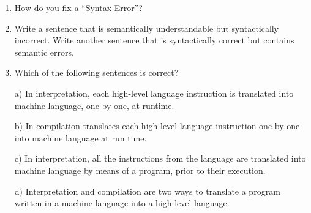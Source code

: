 \begin{enumerate}
(1) Central processing unit, 

(2) Main Memory,

(3) Secondary Memory,

(4) Input Device, and

(5) Output Device.

For example, ``What is the human equivalent to a Central Processing Unit''?

\item How do you fix a ``Syntax Error''?

\item  Write a sentence that is semantically understandable but syntactically incorrect. Write another sentence that is syntactically correct but contains semantic errors.

\item Which of the following sentences is correct?

a) In interpretation, each high-level language instruction is translated into machine language, one by one, at runtime.%

b) In compilation translates each high-level language instruction one by one into machine language at run time.

c) In interpretation, all the instructions from the language are translated into machine language by means of a program, prior to their execution.

d) Interpretation and compilation are two ways to translate a program written in a machine language into a high-level language.

\end{enumerate}
